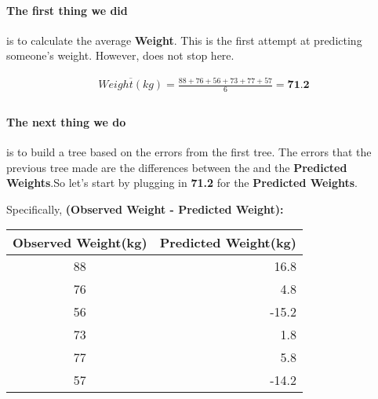 \documentclass[12pt, a4paper]{article} %
\begin{document}
\paragraph{The first thing we did} is to calculate the average \textbf{Weight}. This is the first attempt at predicting someone's weight. However,  does not stop here.

\begin{align*}
    \overline{Weight(kg)} = \frac{88 + 76 + 56 + 73 + 77 + 57}{6} = \textbf{71.2}\\
\end{align*}

\paragraph{The next thing we do} is to build a tree based on the errors from the first tree. The errors that the previous tree made are the differences between the  and the \textbf{Predicted Weights}.So let's start by plugging in \textbf{71.2} for the \textbf{Predicted Weights}.

Specifically, \textbf{(Observed Weight - Predicted Weight):}



\begin{table}[h!]
\begin{center}
\begin{tabular}{c|r} %
    
    \hline
    \hline
       
        \textbf{Observed Weight(kg)}
        
    &   \textbf{Predicted Weight(kg)}
       
      \\
      
      \hline
      \hline
      
       88 &  16.8\\
       76 &  4.8\\
       56 &  -15.2 \\
       73 &  1.8\\
       77 &  5.8\\
       57 &  -14.2\\
      
      \hline
      \hline
      
\end{tabular}
\end{center}
\end{table}
\end{document}

